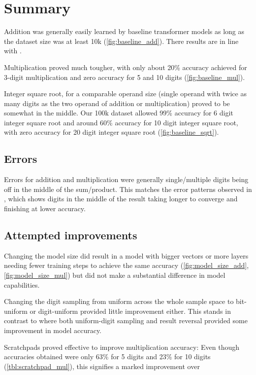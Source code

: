 \section{Summary}

Addition was generally easily learned by baseline transformer models as long as the dataset size was at least 10k (\cref{fig:baseline_add}). There results are in line with \cite{teaching}.

Multiplication proved much tougher, with only about 20\% accuracy achieved for 3-digit multiplication and zero accuracy for 5 and 10 digits (\cref{fig:baseline_mul}).

Integer square root, for a comparable operand size (single operand with twice as many digits as the two operand of addition or multiplication) proved to be somewhat in the middle. Our 100k dataset allowed 99\% accuracy for 6 digit integer square root and around 60\% accuracy for 10 digit integer square root, with zero accuracy for 20 digit integer square root (\cref{fig:baseline_sqrt}).

\subsection{Errors}
Errors for addition and multiplication were generally single/multiple digits being off in the middle of the sum/product. This matches the error patterns observed in , which shows digits in the middle of the result taking longer to converge and finishing at lower accuracy.

\subsection{Attempted improvements}
Changing the model size did result in a model with bigger vectors or more layers needing fewer training steps to achieve the same accuracy (\cref{fig:model_size_add}, \cref{fig:model_size_mul}) but did not make a substantial difference in model capabilities.

Changing the digit sampling from uniform across the whole sample space to bit-uniform or digit-uniform provided little improvement either. This stands in contrast to \cite{positionmatters} where both uniform-digit sampling and result reversal provided some improvement in model accuracy.

Scratchpads proved effective to improve multiplication accuracy: Even though accuracies obtained were only 63\% for 5 digits and 23\% for 10 digits (\cref{tbl:scratchpad_mul}), this signifies a marked improvement over

